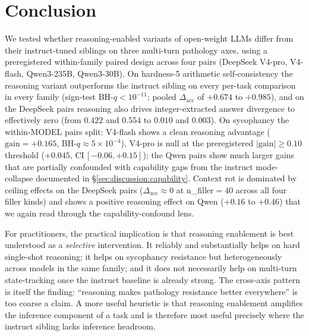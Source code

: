 \section{Conclusion}
\label{sec:conclusion}

We tested whether reasoning-enabled variants of open-weight
LLMs differ from their instruct-tuned siblings on three multi-turn
pathology axes, using a preregistered within-family paired design
across four pairs (DeepSeek V4-pro, V4-flash, Qwen3-235B, Qwen3-30B).
On hardness-5 arithmetic self-consistency the reasoning variant
outperforms the instruct sibling on every per-task comparison in every
family (sign-test BH-$q < 10^{-11}$; pooled $\Delta_{\mathrm{acc}}$ of
$+0.674$ to $+0.985$), and on the DeepSeek pairs reasoning also drives
integer-extracted answer divergence to effectively zero (from $0.422$
and $0.554$ to $0.010$ and $0.003$). On sycophancy the within-MODEL
pairs split: V4-flash shows a clean reasoning advantage
($\mathrm{gain}{=}+0.165$, BH-$q\approx 5{\times}10^{-4}$), V4-pro is
null at the preregistered $|\mathrm{gain}|\geq 0.10$ threshold
($+0.045$, $\mathrm{CI}\,[-0.06, +0.15]$); the Qwen pairs show much
larger gains that are partially confounded with capability gaps from
the instruct mode-collapse documented in
\S\ref{sec:discussion:capability}. Context rot is dominated by ceiling
effects on the DeepSeek pairs ($\Delta_{\mathrm{acc}}\approx 0$ at
n\_filler${=}40$ across all four filler kinds) and shows a positive
reasoning effect on Qwen ($+0.16$ to $+0.46$) that we again read
through the capability-confound lens.

For practitioners, the practical implication is that reasoning
enablement is best understood as a \emph{selective} intervention. It
reliably and substantially helps on hard single-shot reasoning; it
helps on sycophancy resistance but heterogeneously across models in
the same family; and it does not necessarily help on multi-turn
state-tracking once the instruct baseline is already strong. The
cross-axis pattern is itself the finding: ``reasoning makes pathology
resistance better everywhere'' is too coarse a claim. A more useful
heuristic is that reasoning enablement amplifies the inference
component of a task and is therefore most useful precisely where the
instruct sibling lacks inference headroom.

